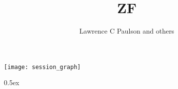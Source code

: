 \documentclass[11pt,a4paper]{article}
\begin{document}
\title{ZF}
\author{Lawrence C Paulson and others}
\maketitle

\tableofcontents

\begin{center}
  \texttt{[image: session\_graph]}
\end{center}

\newpage

\renewcommand{\setisabellecontext}[1]{\markright{THEORY~``#1''}}

\parindent 0pt\parskip 0.5ex



%
%
\end{document}

